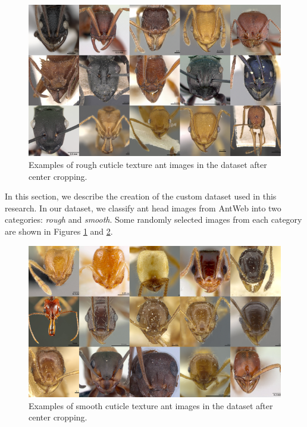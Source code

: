 \documentclass[12pt]{article}
\begin{document}
\begin{figure}[h]
    \centering
    \includegraphics[width=1\textwidth]{assets/images/rough_collage.png}
    \caption{Examples of rough cuticle texture ant images in the dataset after
        center cropping.}
    \label{fig:rough-cuticle-texture}
\end{figure}

In this section, we describe the creation of the custom dataset used in this
research. In our dataset, we classify ant head images from AntWeb
\cite{perrichot_antweb_2012} into two categories: \textit{rough} and
\textit{smooth}. Some randomly selected images from each category are shown in
Figures \ref{fig:rough-cuticle-texture} and \ref{fig:smooth-cuticle-texture}.

\begin{figure}
    \centering
    \includegraphics[width=1\textwidth]{assets/images/smooth_collage.png}
    \caption{Examples of smooth cuticle texture ant images in the dataset after
        center cropping.}
    \label{fig:smooth-cuticle-texture}
\end{figure}
\end{document}

